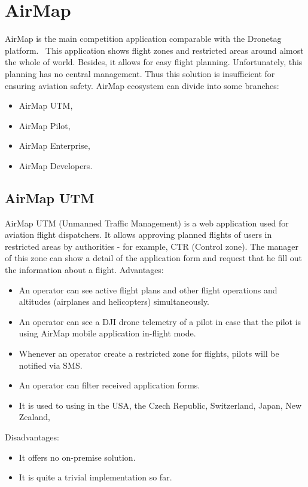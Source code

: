 \section{AirMap}\label{sec:airmap}
AirMap is the main competition application comparable with the Dronetag platform.~\cite{airMap}
This application shows flight zones and restricted areas around almost the whole of world.
Besides, it allows for easy flight planning.
Unfortunately, this planning has no central management.
Thus this solution is insufficient for ensuring aviation safety.
AirMap ecosystem can divide into some branches:
\begin{itemize}
    \item AirMap UTM,
    \item AirMap Pilot,
    \item AirMap Enterprise,
    \item AirMap Developers.
\end{itemize}


\subsection{AirMap UTM}\label{subsec:airmap-utm}
AirMap UTM (Unmanned Traffic Management) is a web application used for aviation flight dispatchers.
It allows approving planned flights of users in restricted areas by authorities - for example, CTR (Control zone).
The manager of this zone can show a detail of the application form and request that he fill out the information about a flight.
\newline
\newline
\newline
\newline
Advantages:
\begin{itemize}
    \item An operator can see active flight plans and other flight operations and altitudes (airplanes and helicopters) simultaneously.
    \item An operator can see a DJI drone telemetry of a pilot in case that the pilot is using AirMap mobile application in-flight mode.
    \item Whenever an operator create a restricted zone for flights, pilots will be notified via SMS.
    \item An operator can filter received application forms.
    \item It is used to using in the USA, the Czech Republic, Switzerland, Japan, New Zealand,~\textellipsis
\end{itemize}
Disadvantages:
\begin{itemize}
    \item It offers no on-premise solution.
    \item It is quite a trivial implementation so far.
\end{itemize}


